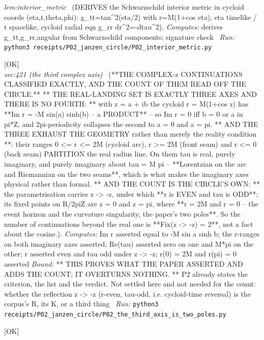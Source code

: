 \begin{description}
\textit{lem:interior\_metric} \ (DERIVES the Schwarzschild interior metric in cycloid coords (eta,t,theta,phi): g\_tt=tan\textasciicircum{}2(eta/2) with r=M(1+cos eta), eta timelike / t spacelike, cycloid radial eqn g\_rr dr\textasciicircum{}2=-dtau\textasciicircum{}2). 
\emph{Computes:} derives g\_tt,g\_rr,angular from Schwarzschild components; signature check
\ \emph{Run:} \texttt{python3 receipts/P02\_janzen\_circle/P02\_interior\_metric.py}
\item[\rcptlabel{P02_the_third_axis_is_two_poles}{P2R7}\textbf{P2R7}\quad\texttt{P02\_the\_third\_axis\_is\_two\_poles}]\hfill\textsf{[OK]}\\
\textit{sec:421 (the third complex axis)} \ (**THE COMPLEX-z CONTINUATIONS CLASSIFIED EXACTLY, AND THE COUNT OF THEM READ OFF THE CIRCLE.** ** THE REAL-LANDING SET IS EXACTLY THREE AXES AND THERE IS NO FOURTH: ** with z = a + ib the cycloid r = M(1+cos z) has **Im r = -M sin(a) sinh(b) -- a PRODUCT** -- so Im r = 0 iff b = 0 or a in pi*Z, and 2pi-periodicity collapses the second to a = 0 and a = pi. ** AND THE THREE EXHAUST THE GEOMETRY rather than merely the reality condition **: their ranges 0 <= r <= 2M (cycloid arc), r >= 2M (front seam) and r <= 0 (back seam) PARTITION the real radius line. On them tau is real, purely imaginary, and purely imaginary about tau = M pi -- **Lorentzian on the arc and Riemannian on the two seams**, which is what makes the imaginary axes physical rather than formal. ** AND THE COUNT IS THE CIRCLE'S OWN: ** the parametrisation carries z -> -z, under which **r is EVEN and tau is ODD**; its fixed points on R/2piZ are z = 0 and z = pi, where **r = 2M and r = 0 -- the event horizon and the curvature singularity, the paper's two poles**. So the number of continuations beyond the real one is **\textbar{}Fix(z -> -z)\textbar{} = 2**, not a fact about the cosine.). 
\emph{Computes:} Im r asserted equal to -M sin a sinh b; the r-ranges on both imaginary axes asserted; Re(tau) asserted zero on one and M*pi on the other; r asserted even and tau odd under z -> -z; r(0) = 2M and r(pi) = 0 asserted
 \emph{Bound:} ** THIS PROVES WHAT THE PAPER ASSERTED AND ADDS THE COUNT; IT OVERTURNS NOTHING. ** P2 already states the criterion, the list and the verdict. Not settled here and not needed for the count: whether the reflection z -> -z (r-even, tau-odd, i.e. cycloid-time reversal) is the corpus's R, its K, or a third thing
\ \emph{Run:} \texttt{python3 receipts/P02\_janzen\_circle/P02\_the\_third\_axis\_is\_two\_poles.py}
\item[\rcptlabel{P02_the_approach_is_mass_free}{P2R8}\textbf{P2R8}\quad\texttt{P02\_the\_approach\_is\_mass\_free}]\hfill\textsf{[OK]}\\

\end{description}
